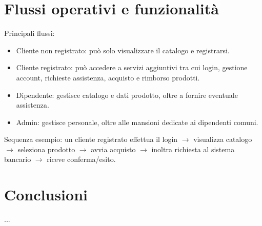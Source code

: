\documentclass[a4paper,12pt]{article}
\begin{document}
\section{Flussi operativi e funzionalità}
Principali flussi:
\begin{itemize}
  \item Cliente non registrato: può solo visualizzare il catalogo e registrarsi.
  \item Cliente registrato: può accedere a servizi aggiuntivi tra cui login, gestione account, richieste assistenza, acquisto e rimborso prodotti.
  \item Dipendente: gestisce catalogo e dati prodotto, oltre a fornire eventuale assistenza.
  \item Admin: gestisce personale, oltre alle mansioni dedicate ai dipendenti comuni.
\end{itemize}
Sequenza esempio: un cliente registrato effettua il login $\rightarrow$ visualizza catalogo $\rightarrow$ seleziona prodotto $\rightarrow$ avvia acquisto $\rightarrow$ inoltra richiesta al sistema bancario $\rightarrow$ riceve conferma/esito.


\section{Conclusioni}
...
\end{document}

